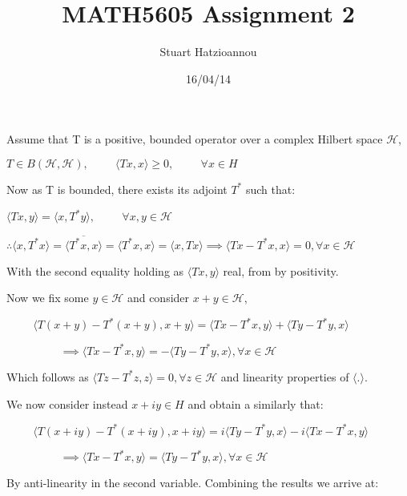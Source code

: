 \documentclass[10pt,a4paper]{article}
\title{MATH5605 Assignment 2}
\author{Stuart Hatzioannou}
\date{16/04/14}
\begin{document}
	
Assume that T is a positive, bounded operator over a complex Hilbert space $\mathcal{H}$,

 \hspace{2cm}$T \in B(\mathcal{H},\mathcal{H}), \hspace{1cm}  \langle Tx , x \rangle \ge  0, \hspace{1cm}  \forall x \in H$
 
 Now as T is bounded, there exists its adjoint $T^*$ such that:
 
 \hspace{4cm}$\langle Tx , y \rangle = \langle x , T^*y \rangle, \hspace{1cm}  \forall x,y \in \mathcal{H}$

$\therefore \langle x , T^*x \rangle = \overline{\langle T^*x , x \rangle} =\langle T^*x , x \rangle = \langle x , Tx \rangle \implies \langle Tx - T^*x , x \rangle = 0, \forall x \in \mathcal{H}$

With the second equality holding as $\langle Tx , y \rangle$ real, from by positivity.

Now we fix some $y \in \mathcal{H}$ and consider $x+y \in \mathcal{H}$,

$ \hspace{1cm} \langle T(x+y) - T^*(x+y) , x+y \rangle = \langle Tx - T^*x , y \rangle + \langle Ty - T^*y , x \rangle$ 

$ \hspace{2cm}\implies \langle Tx - T^*x , y \rangle = -\langle Ty - T^*y , x \rangle, \forall x \in \mathcal{H}$

Which follows as $\langle Tz - T^*z , z \rangle = 0, \forall z \in \mathcal{H}$ and linearity properties of $\langle . \rangle$.

We now consider instead $x+iy \in H$ and obtain a similarly that:

$ \hspace{1cm} \langle T(x+iy) - T^*(x+iy) , x+iy \rangle = i\langle Ty - T^*y , x \rangle - i\langle Tx - T^*x , y \rangle$ 

$ \hspace{2cm}\implies \langle Tx - T^*x , y \rangle = \langle Ty - T^*y , x \rangle, \forall x \in \mathcal{H}$

By anti-linearity in the second variable. Combining the results we arrive at:
\end{document}
